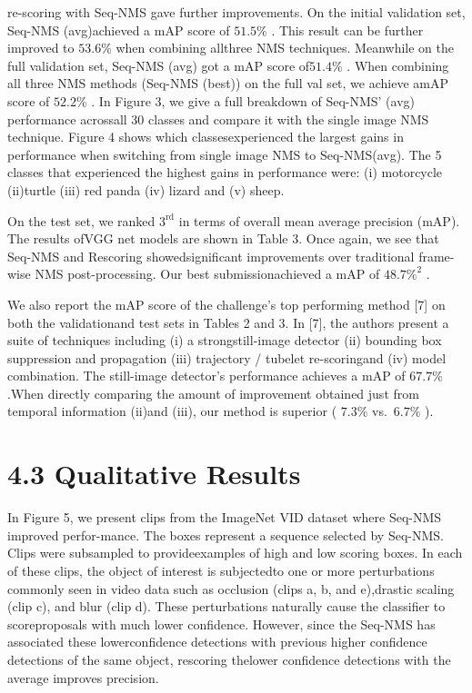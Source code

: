 \documentclass[
  10
]{article}
\begin{document}
re-scoring with Seq-NMS gave further improvements. On the initial
validation set, Seq-NMS (avg)achieved a mAP score of \(5 1 . 5 \%\) .
This result can be further improved to \(5 3 . 6 \%\) when combining
allthree NMS techniques. Meanwhile on the full validation set, Seq-NMS
(avg) got a mAP score of\(5 1 . 4 \%\) . When combining all three NMS
methods (Seq-NMS (best)) on the full val set, we achieve amAP score of
\(5 2 . 2 \%\) . In Figure 3, we give a full breakdown of Seq-NMS' (avg)
performance acrossall 30 classes and compare it with the single image
NMS technique. Figure 4 shows which classesexperienced the largest gains
in performance when switching from single image NMS to Seq-NMS(avg). The
5 classes that experienced the highest gains in performance were: (i)
motorcycle (ii)turtle (iii) red panda (iv) lizard and (v) sheep.

On the test set, we ranked \(3 ^ { \mathrm { r d } }\) in terms of
overall mean average precision (mAP). The results ofVGG net models are
shown in Table 3. Once again, we see that Seq-NMS and Rescoring
showedsignificant improvements over traditional frame-wise NMS
post-processing. Our best submissionachieved a mAP of
\(4 8 . 7 \% ^ { 2 }\) .

We also report the mAP score of the challenge's top performing method
{[}7{]} on both the validationand test sets in Tables 2 and 3. In
{[}7{]}, the authors present a suite of techniques including (i) a
strongstill-image detector (ii) bounding box suppression and propagation
(iii) trajectory / tubelet re-scoringand (iv) model combination. The
still-image detector's performance achieves a mAP of \(6 7 . 7 \%\)
.When directly comparing the amount of improvement obtained just from
temporal information (ii)and (iii), our method is superior (
\(7 . 3 \%\) vs.~\(6 . 7 \%\) ).

\section{4.3 Qualitative Results}\label{qualitative-results}

In Figure 5, we present clips from the ImageNet VID dataset where
Seq-NMS improved perfor-mance. The boxes represent a sequence selected
by Seq-NMS. Clips were subsampled to provideexamples of high and low
scoring boxes. In each of these clips, the object of interest is
subjectedto one or more perturbations commonly seen in video data such
as occlusion (clips a, b, and e),drastic scaling (clip c), and blur
(clip d). These perturbations naturally cause the classifier to
scoreproposals with much lower confidence. However, since the Seq-NMS
has associated these lowerconfidence detections with previous higher
confidence detections of the same object, rescoring thelower confidence
detections with the average improves precision.
\end{document}
